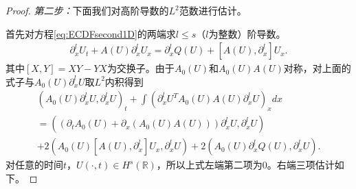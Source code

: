 \begin{proof}
\emph{第二步：}下面我们对高阶导数的$L^2$范数进行估计。

首先对方程\eqref{eq:ECDFsecond1D}的两端求$l\le s$（$l$为整数）阶导数。 
\begin{eqnarray*}
\partial^l_x U_t + A(U) \partial^l_x U_x = \partial^l_x Q(U) + [A(U),\partial^l_x]U_x.
\end{eqnarray*}
其中$[X,Y]=XY-YX$为交换子。由于$A_0(U)$和$A_0(U)A(U)$对称，对上面的式子与$A_0(U)\partial^l_x U$取$L^2$内积得到
\begin{multline}\label{45}
  (A_0(U)\partial^l_x U,\partial^l_x U)_t + \int (\partial^l_x U^T A_0(U)A(U)\partial^l_x U)_x dx \\
  = ((\partial_t A_0(U)+\partial_x(A_0(U)A(U)))\partial^l_x U,\partial^l_x U) \\
  + 2(A_0(U)[A(U),\partial^l_x]U_x,\partial^l_x U) + 2(A_0(U) \partial^l_x Q(U), \partial^l_x U).
\end{multline}
对任意的时间$t$，$U(\cdot, t)\in H^s(\mathbb{R})$，所以上式左端第二项为0。右端三项估计如下。


\end{proof}
